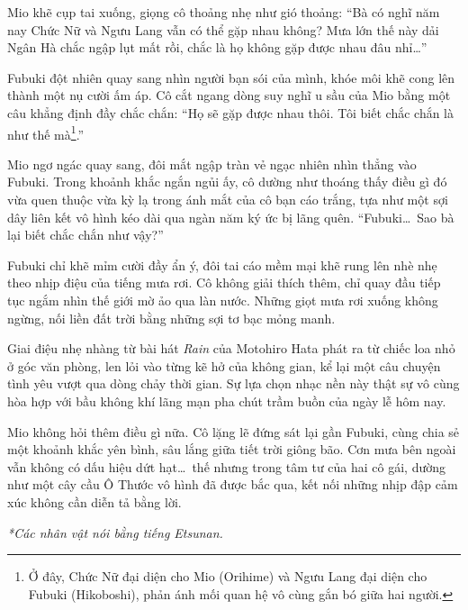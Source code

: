\documentclass[../main.tex]{subfiles}
\begin{document}
Mio khẽ cụp tai xuống, giọng cô thoảng nhẹ như gió thoảng: ``Bà có nghĩ năm nay Chức Nữ và Ngưu Lang vẫn có thể gặp nhau không? Mưa lớn thế này dải Ngân Hà chắc ngập lụt mất rồi, chắc là họ không gặp được nhau đâu nhỉ\dots''

Fubuki đột nhiên quay sang nhìn người bạn sói của mình, khóe môi khẽ cong lên thành một nụ cười ấm áp. Cô cắt ngang dòng suy nghĩ u sầu của Mio bằng một câu khẳng định đầy chắc chắn: ``Họ sẽ gặp được nhau thôi. Tôi biết chắc chắn là như thế mà\footnote{Ở đây, Chức Nữ đại diện cho Mio (Orihime) và Ngưu Lang đại diện cho Fubuki (Hikoboshi), phản ánh mối quan hệ vô cùng gắn bó giữa hai người.}.''

Mio ngơ ngác quay sang, đôi mắt ngập tràn vẻ ngạc nhiên nhìn thẳng vào Fubuki. Trong khoảnh khắc ngắn ngủi ấy, cô dường như thoáng thấy điều gì đó vừa quen thuộc vừa kỳ lạ trong ánh mắt của cô bạn cáo trắng, tựa như một sợi dây liên kết vô hình kéo dài qua ngàn năm ký ức bị lãng quên. ``Fubuki\dots\ Sao bà lại biết chắc chắn như vậy?''


Fubuki chỉ khẽ mỉm cười đầy ẩn ý, đôi tai cáo mềm mại khẽ rung lên nhè nhẹ theo nhịp điệu của tiếng mưa rơi. Cô không giải thích thêm, chỉ quay đầu tiếp tục ngắm nhìn thế giới mờ ảo qua làn nước. Những giọt mưa rơi xuống không ngừng, nối liền đất trời bằng những sợi tơ bạc mỏng manh.

Giai điệu nhẹ nhàng từ bài hát \textit{Rain} của Motohiro Hata phát ra từ chiếc loa nhỏ ở góc văn phòng, len lỏi vào từng kẽ hở của không gian, kể lại một câu chuyện tình yêu vượt qua dòng chảy thời gian. Sự lựa chọn nhạc nền này thật sự vô cùng hòa hợp với bầu không khí lãng mạn pha chút trầm buồn của ngày lễ hôm nay.

Mio không hỏi thêm điều gì nữa. Cô lặng lẽ đứng sát lại gần Fubuki, cùng chia sẻ một khoảnh khắc yên bình, sâu lắng giữa tiết trời giông bão. Cơn mưa bên ngoài vẫn không có dấu hiệu dứt hạt\dots\ thế nhưng trong tâm tư của hai cô gái, dường như một cây cầu Ô Thước vô hình đã được bắc qua, kết nối những nhịp đập cảm xúc không cần diễn tả bằng lời.

\omk

\begin{center}
  {\textit{*Các nhân vật nói bằng tiếng Etsunan.}}
\end{center}

\end{document}
